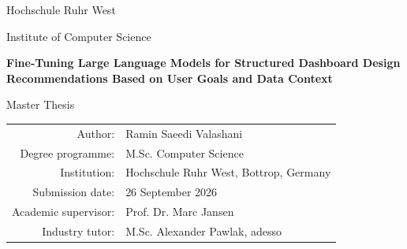 \begin{titlepage}
\centering
\vspace*{2cm}
{\Large Hochschule Ruhr West\par}
\vspace{0.4cm}
{\large Institute of Computer Science\par}
\vfill
{\LARGE\bfseries Fine-Tuning Large Language Models for Structured Dashboard Design Recommendations Based on User Goals and Data Context\par}
\vspace{1.5cm}
{\Large Master Thesis\par}
\vfill
\begin{tabular}{rl}
Author: & Ramin Saeedi Valashani \\
Degree programme: & M.Sc. Computer Science \\
Institution: & Hochschule Ruhr West, Bottrop, Germany \\
Submission date: & 26 September 2026 \\
Academic supervisor: & Prof. Dr. Marc Jansen \\
Industry tutor: & M.Sc. Alexander Pawlak, adesso \\
\end{tabular}
\vfill
\end{titlepage}
